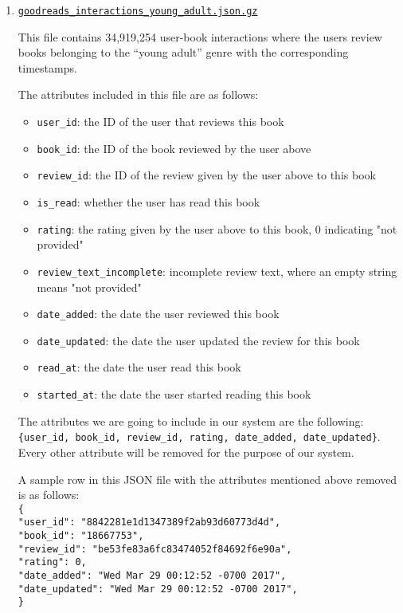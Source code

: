 \documentclass[fontsize=11pt]{article}
\begin{document}
\begin{itemize}
\begin{enumerate}
\item \texttt{\href{https://drive.google.com/uc?id=1NNX7SWcKahezLFNyiW88QFPAqOAYP5qg}{goodreads\_interactions\_young\_adult.json.gz}}
 
This file contains 34,919,254 user-book interactions where the users review books belonging to the “young adult” genre with the corresponding timestamps.
 
The attributes included in this file are as follows:
\begin{itemize}
\item \texttt{user\_id}: the ID of the user that reviews this book
\item \texttt{book\_id}: the ID of the book reviewed by the user above
\item \texttt{review\_id}: the ID of the review given by the user above to this book
\item \texttt{is\_read}: whether the user has read this book
\item \texttt{rating}: the rating given by the user above to this book, 0 indicating "not provided"
\item \texttt{review\_text\_incomplete}: incomplete review text, where an empty string means "not provided"
\item \texttt{date\_added}: the date the user reviewed this book
\item \texttt{date\_updated}: the date the user updated the review for this book
\item \texttt{read\_at}: the date the user read this book
\item \texttt{started\_at}: the date the user started reading this book
\end{itemize}

The attributes we are going to include in our system are the following:
\texttt{\{user\_id, book\_id, review\_id, rating, date\_added, date\_updated\}}. Every other attribute will be removed for the purpose of our system.
 
A sample row in this JSON file with the attributes mentioned above removed is as follows:\\
\texttt{\{\\
"user\_id": "8842281e1d1347389f2ab93d60773d4d",\\
"book\_id": "18667753",\\
"review\_id": "be53fe83a6fc83474052f84692f6e90a",\\
"rating": 0,\\
"date\_added": "Wed Mar 29 00:12:52 -0700 2017", \\
"date\_updated": "Wed Mar 29 00:12:52 -0700 2017",\\
\}} \\


\end{enumerate}
\end{itemize}
\end{document}
